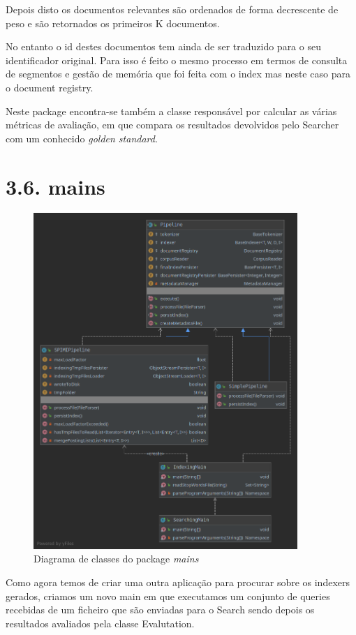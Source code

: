 \documentclass[12pt]{article}
\begin{document}
Depois disto os documentos relevantes são ordenados de forma
decrescente de peso e são retornados os primeiros K documentos.

No entanto o id destes documentos tem ainda de ser traduzido para o
seu identificador original.
Para isso é feito o mesmo processo em termos de consulta de segmentos
e gestão de memória que foi feita com o index mas neste caso para o
document registry.

Neste package encontra-se também a classe responsável por calcular as
várias métricas de avaliação, em que compara os resultados devolvidos
pelo Searcher com um conhecido {\it golden standard}.

\section*{3.6. mains}
\begin{figure}[H]
  \center
   \includegraphics[width=10cm]{packages_mains.png}
  \caption{Diagrama de classes do package \it mains}
\end{figure}

Como agora temos de criar uma outra aplicação para procurar sobre os
indexers gerados, criamos um novo main em que executamos um conjunto
de queries recebidas de um ficheiro que são enviadas para o Search
sendo depois os resultados avaliados pela classe Evalutation.
\end{document}
